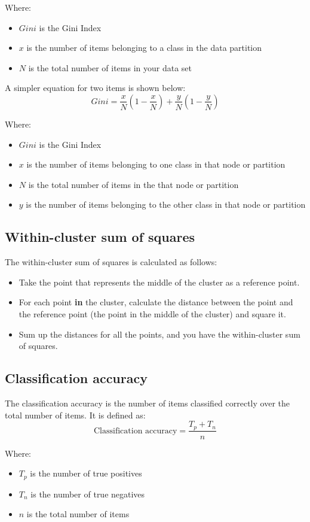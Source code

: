 \documentclass[11pt]{article}
\begin{document}
Where:
\begin{itemize}
\item \(Gini\) is the Gini Index
\item \(x\) is the number of items belonging to a class in the data partition
\item \(N\) is the total number of items in your data set
\end{itemize}

A simpler equation for two items is shown below:
\[Gini = \frac{x}{N} \left(1 - \frac{x}{N} \right) + \frac{y}{N} \left(1 - \frac{y}{N} \right)\]

Where:
\begin{itemize}
\item \(Gini\) is the Gini Index
\item \(x\) is the number of items belonging to one class in that node or partition
\item \(N\) is the total number of items in the that node or partition
\item \(y\) is the number of items belonging to the other class in that node or partition
\end{itemize}
\subsection{Within-cluster sum of squares}
\label{sec:orgae61d9d}
The within-cluster sum of squares is calculated as follows:
\begin{itemize}
\item Take the point that represents the middle of the cluster as a reference point.
\item For each point \textbf{in} the cluster, calculate the distance between the point and the reference point (the point in the middle of the cluster) and square it.
\item Sum up the distances for all the points, and you have the within-cluster sum of squares.
\end{itemize}
\subsection{Classification accuracy}
\label{sec:org2b52b3c}
The classification accuracy is the number of items classified correctly over the total number of items. It is defined as:
\[\text{Classification accuracy} = \frac{T_p + T_n}{n}\]

Where:
\begin{itemize}
\item \(T_p\) is the number of true positives
\item \(T_n\) is the number of true negatives
\item \(n\) is the total number of items
\end{itemize}
\end{document}

